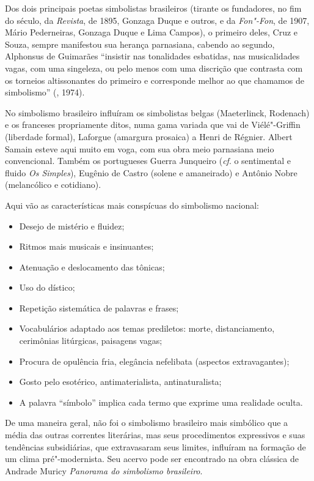 Dos dois principais poetas simbolistas brasileiros (tirante os
fundadores, no fim do século, da \emph{Revista}, de 1895, Gonzaga Duque
e outros, e da \emph{Fon"-Fon}, de 1907, Mário Pederneiras, Gonzaga Duque
e Lima Campos), o primeiro deles, Cruz e Souza, sempre manifestou sua
herança parnasiana, cabendo ao segundo, Alphonsus de Guimarães
``insistir nas tonalidades esbatidas, nas musicalidades vagas, com uma
singeleza, ou pelo menos com uma discrição que contrasta com os torneios
altissonantes do primeiro e corresponde melhor ao que chamamos de
simbolismo'' (, 1974).

No simbolismo brasileiro influíram os simbolistas belgas (Maeterlinck,
Rodenach) e os franceses propriamente ditos, numa gama variada que vai
de Viélé"-Griffin (liberdade formal), Laforgue (amargura prosaica) a
Henri de Régnier. Albert Samain esteve aqui muito em voga, com sua obra
meio parnasiana meio convencional. Também os portugueses Guerra
Junqueiro (\emph{cf}. o sentimental e fluido \emph{Os Simples}), Eugênio de
Castro (solene e amaneirado) e Antônio Nobre (melancólico e cotidiano).

Aqui vão as características mais conspícuas do simbolismo nacional:

\begin{itemize}
\item
  Desejo de mistério e fluidez;
\item
  Ritmos mais musicais e insinuantes;
\item
  Atenuação e deslocamento das tônicas;
\item
  Uso do dístico;
\item
  Repetição sistemática de palavras e frases;
\item
  Vocabulários adaptado aos temas prediletos: morte, distanciamento,
  cerimônias litúrgicas, paisagens vagas;
\item
  Procura de opulência fria, elegância nefelibata (aspectos
  extravagantes);
\item
  Gosto pelo esotérico, antimaterialista, antinaturalista;
\item
  A palavra ``símbolo'' implica cada termo que exprime uma realidade
  oculta.
\end{itemize}

De uma maneira geral, não foi o simbolismo brasileiro mais simbólico que
a média das outras correntes literárias, mas seus procedimentos
expressivos e suas tendências subsidiárias, que extravasaram seus
limites, influíram na formação de um clima pré"-modernista. Seu acervo
pode ser encontrado na obra clássica de Andrade Muricy \emph{Panorama do
simbolismo brasileiro}.

